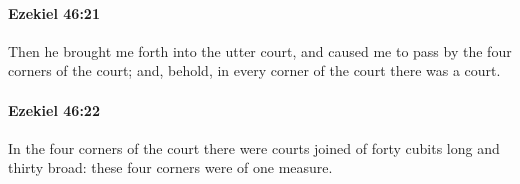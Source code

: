 		\paragraph{Ezekiel 46:21} %
			\label{EZEKIEL-46-21}

			Then he brought me forth into the utter court, and caused me to pass by the four corners of the court; and, behold, in every corner of the court there was a court.


		\paragraph{Ezekiel 46:22} %
			\label{EZEKIEL-46-22}

			In the four corners of the court there were courts joined of forty cubits long and thirty broad: these four corners were of one measure.


